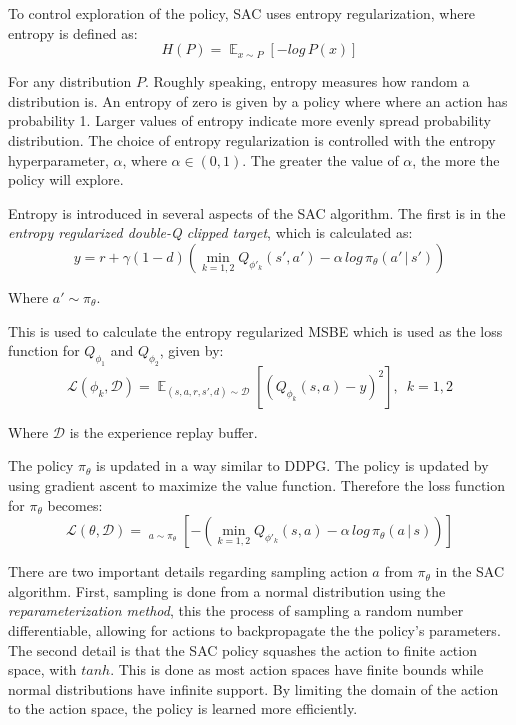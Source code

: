 \documentclass[conference]{IEEEtran}
\begin{document}
To control exploration of the policy, SAC uses entropy regularization, where entropy is defined as:
$$
    H(P) = \mathop{\mathbb{E}}_{x \sim P} \left[- log \, P(x)\right]
$$
\begin{flushleft}
    For any distribution $P$. Roughly speaking, entropy measures how random a distribution is. An entropy of zero is given by a policy where where an action has probability 1. Larger values of entropy indicate more evenly spread probability distribution. The choice of entropy regularization is controlled with the entropy hyperparameter, $\alpha$, where $\alpha \in (0, 1)$. The greater the value of $\alpha$, the more the policy will explore.
\end{flushleft}

Entropy is introduced in several aspects of the SAC algorithm. The first is in the \textit{entropy regularized double-Q clipped target}, which is calculated as:
$$
    y = r + \gamma(1-d)\left(\mathop{min}_{k=1,2}Q_{\phi'_k}(s', a') - \alpha \, log \, \pi_\theta(a' \, | \, s')\right)
$$

\begin{flushleft}
    Where $a' \sim \pi_\theta$.
\end{flushleft}

This is used to calculate the entropy regularized MSBE which is used as the loss function for $Q_{\phi_1}$ and $Q_{\phi_2}$, given by:
$$
    \mathcal{L}(\phi_k, \mathcal{D}) = \mathop{\mathbb{E}}_{(s,a,r,s',d) \sim \mathcal{D}}\left[\left(Q_{\phi_k}(s,a) - y\right)^2\right], \enspace k=1,2
$$
\begin{flushleft}
    Where $\mathcal{D}$ is the experience replay buffer.
\end{flushleft}

The policy $\pi_\theta$ is updated in a way similar to DDPG. The policy is updated by using gradient ascent to maximize the value function. Therefore the loss function for $\pi_\theta$ becomes:
$$
    \mathcal{L}(\theta, \mathcal{D}) = \mathop{\mathop{\mathbb{E}}_{s \sim \mathcal{D}}}_{a \sim \pi_\theta} \left[-\left(\mathop{min}_{k=1,2} Q_{\phi'_k}(s, a) - \alpha \, log \, \pi_\theta(a \, | \, s)\right)\right]
$$

There are two important details regarding sampling action $a$ from $\pi_\theta$ in the SAC algorithm. First, sampling is done from a normal distribution using the \textit{reparameterization method}, this the process of sampling a random number differentiable, allowing for actions to backpropagate the the policy's parameters. The second detail is that the SAC policy squashes the action to finite action space, with $tanh$. This is done as most action spaces have finite bounds while normal distributions have infinite support. By limiting the domain of the action to the action space, the policy is learned more efficiently.
\end{document}
